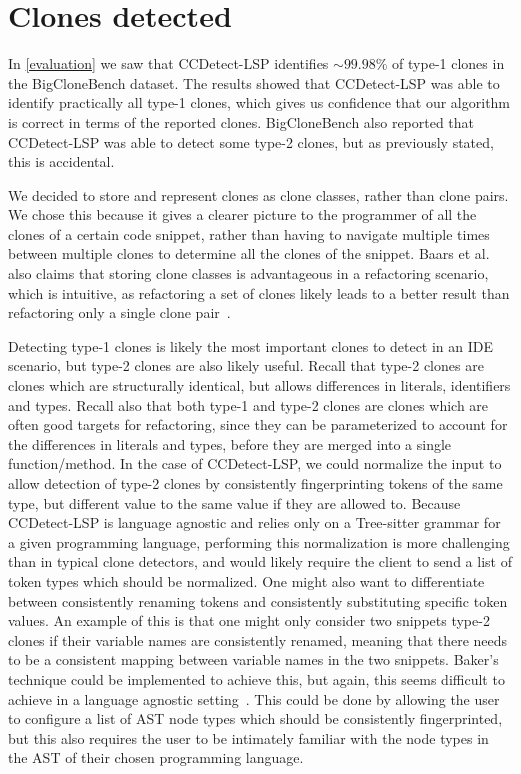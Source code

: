 \section{Clones detected}

In \cref{evaluation} we saw that CCDetect-LSP identifies ${\sim}99.98\%$ of type-1 clones in
the BigCloneBench dataset. The results showed that CCDetect-LSP was able to identify
practically all type-1 clones, which gives us confidence that our algorithm is correct in
terms of the reported clones. BigCloneBench also reported that CCDetect-LSP was able to
detect some type-2 clones, but as previously stated, this is accidental.

We decided to store and represent clones as clone classes, rather than clone pairs. We
chose this because it gives a clearer picture to the programmer of all the clones of a
certain code snippet, rather than having to navigate multiple times between multiple
clones to determine all the clones of the snippet. Baars et al. also claims that storing
clone classes is advantageous in a refactoring scenario, which is intuitive, as
refactoring a set of clones likely leads to a better result than refactoring only a single
clone pair~\cite{TowardsAutomatedRefactoring}.

Detecting type-1 clones is likely the most important clones to detect in an IDE scenario,
but type-2 clones are also likely useful. Recall that type-2 clones are clones which are
structurally identical, but allows differences in literals, identifiers and types. Recall
also that both type-1 and type-2 clones are clones which are often good targets for
refactoring, since they can be parameterized to account for the differences in literals
and types, before they are merged into a single function/method. In the case of
CCDetect-LSP, we could normalize the input to allow detection of type-2 clones by
consistently fingerprinting tokens of the same type, but different value to the same value
if they are allowed to. Because CCDetect-LSP is language agnostic and relies only on a
Tree-sitter grammar for a given programming language, performing this normalization is
more challenging than in typical clone detectors, and would likely require the client to
send a list of token types which should be normalized. One might also want to
differentiate between consistently renaming tokens and consistently substituting specific
token values. An example of this is that one might only consider two snippets type-2
clones if their variable names are consistently renamed, meaning that there needs to be a
consistent mapping between variable names in the two snippets. Baker's technique could be
implemented to achieve this, but again, this seems difficult to achieve in a language
agnostic setting~\cite{Bakerdup}. This could be done by allowing the user to configure a
list of AST node types which should be consistently fingerprinted, but this also requires
the user to be intimately familiar with the node types in the AST of their chosen
programming language.

